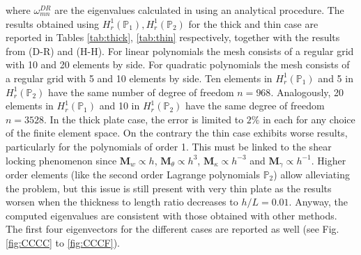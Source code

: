 \documentclass[preprint,12pt]{elsarticle}
\begin{document}
{where $\omega_{mn}^{DR}$ are the eigenvalues calculated in \cite{dawe1980rayleigh} using an analytical procedure. The results obtained using $H_r^1(\mathbb{P}_1), H_r^1(\mathbb{P}_2)$ for the thick and thin case are reported in Tables \ref{tab:thick}, \ref{tab:thin} respectively, together with the results from \cite{dawe1980rayleigh} (D-R) and \cite{huang1984nine} (H-H). For linear polynomials the mesh consists of a regular grid with 10 and 20 elements by side. For quadratic polynomials the mesh consists of a regular grid with 5 and 10 elements by side. Ten elements in $H_r^1(\mathbb{P}_1)$ and 5 in $H_r^1(\mathbb{P}_2)$ have the same number of degree of freedom $n=968$. Analogously, 20 elements in $H_r^1(\mathbb{P}_1)$ and 10 in $H_r^1(\mathbb{P}_2)$ have the same degree of freedom $n=3528$.  In the thick plate case,  the error is limited to $2\%$ in each for any choice of the finite element space.  On the contrary the thin case exhibits worse results, particularly for the polynomials of order 1. This must be linked to the shear locking phenomenon since $\bm{M}_{w} \propto h$, $\bm{M}_{\theta} \propto h^3$, $\bm{M}_{\kappa} \propto h^{-3}$ and $\bm{M}_{\gamma} \propto h^{-1}$. Higher order elements (like the second order Lagrange polynomials $\mathbb{P}_2$) allow alleviating the problem, but this issue is still present with very thin plate as the results worsen when the thickness to length ratio decreases to $h/L = 0.01$. Anyway, the computed eigenvalues are consistent with those obtained with other methods. The first four eigenvectors for the different cases are reported as well (see Fig. \ref{fig:CCCC} to \ref{fig:CCCF}).
}
\end{document}
